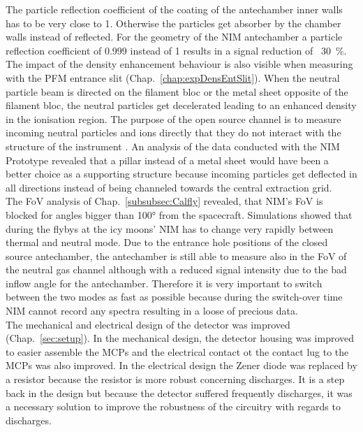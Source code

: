 	The particle reflection coefficient of the coating of the antechamber inner walls has to be very close to 1. Otherwise the particles get absorber by the chamber walls instead of reflected. For the geometry of the NIM antechamber a particle reflection coefficient of 0.999 instead of 1 results in a signal reduction of ~30~\%.\\
	
	
	The impact of the density enhancement behaviour is also visible when measuring with the PFM entrance slit (Chap.~\ref{chap:expDensEntSlit}). When the neutral particle beam is directed on the filament bloc or the metal sheet opposite of the filament bloc, the neutral particles get decelerated leading to an enhanced density in the ionisation region. The purpose of the open source channel is to measure incoming neutral particles and ions directly that they do not interact with the structure of the instrument . An analysis of the data conducted with the NIM Prototype revealed that a pillar instead of a metal sheet would have been a better choice as a supporting structure because incoming particles get deflected in all directions instead of being channeled towards the central extraction grid.\\
	The FoV analysis of Chap.~\ref{subsubsec:Calfly} revealed, that NIM's FoV is blocked for angles bigger than 100° from the spacecraft. Simulations showed that during the flybys at the icy moons' NIM has to change very rapidly between thermal and neutral mode. Due to the entrance hole positions of the closed source antechamber, the antechamber is still able to measure also in the FoV of the neutral gas channel although with a reduced signal intensity due to the bad inflow angle for the antechamber. Therefore it is very important to switch between the two modes as fast as possible because during the switch-over time NIM cannot record any spectra resulting in a loose of precious data.\\
	
	The mechanical and electrical design of the detector was improved (Chap.~\ref{sec:setup}). In the mechanical design, the detector housing was improved to easier assemble the MCPs and the electrical contact ot the contact lug to the MCPs was also improved. In the electrical design the Zener diode was replaced by a resistor because the resistor is more robust concerning discharges. It is a step back in the design but because the detector suffered frequently discharges, it was a necessary solution to improve the robustness of the circuitry with regards to discharges.\\
	

